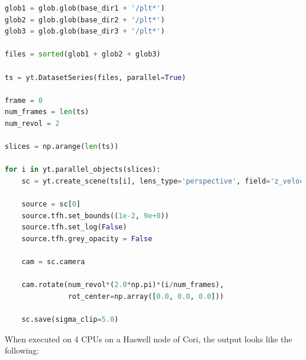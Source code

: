 \begin{itemize}
\begin{lstlisting}[language=python,breaklines=true]
glob1 = glob.glob(base_dir1 + '/plt*')
glob2 = glob.glob(base_dir2 + '/plt*')
glob3 = glob.glob(base_dir3 + '/plt*')

files = sorted(glob1 + glob2 + glob3)

ts = yt.DatasetSeries(files, parallel=True)

frame = 0
num_frames = len(ts)
num_revol = 2

slices = np.arange(len(ts))

for i in yt.parallel_objects(slices):
    sc = yt.create_scene(ts[i], lens_type='perspective', field='z_velocity')

    source = sc[0]
    source.tfh.set_bounds((1e-2, 9e+0))
    source.tfh.set_log(False)
    source.tfh.grey_opacity = False

    cam = sc.camera

    cam.rotate(num_revol*(2.0*np.pi)*(i/num_frames),
               rot_center=np.array([0.0, 0.0, 0.0]))

    sc.save(sigma_clip=5.0)
\end{lstlisting}

When executed on 4 CPUs on a Haswell node of Cori, the output looks like the following:


\end{itemize}
